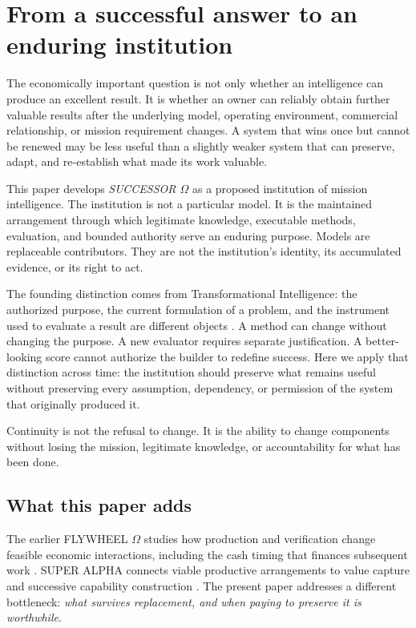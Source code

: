 \section{From a successful answer to an enduring institution}
\label{sec:institution}
The economically important question is not only whether an intelligence can produce an excellent result. It is whether an owner can reliably obtain further valuable results after the underlying model, operating environment, commercial relationship, or mission requirement changes. A system that wins once but cannot be renewed may be less useful than a slightly weaker system that can preserve, adapt, and re-establish what made its work valuable.

This paper develops \emph{SUCCESSOR $\Omega$} as a proposed institution of mission intelligence. The institution is not a particular model. It is the maintained arrangement through which legitimate knowledge, executable methods, evaluation, and bounded authority serve an enduring purpose. Models are replaceable contributors. They are not the institution's identity, its accumulated evidence, or its right to act.

The founding distinction comes from Transformational Intelligence: the authorized purpose, the current formulation of a problem, and the instrument used to evaluate a result are different objects \citep{boucherTI}. A method can change without changing the purpose. A new evaluator requires separate justification. A better-looking score cannot authorize the builder to redefine success. Here we apply that distinction across time: the institution should preserve what remains useful without preserving every assumption, dependency, or permission of the system that originally produced it.

\begin{insight}
Continuity is not the refusal to change. It is the ability to change components without losing the mission, legitimate knowledge, or accountability for what has been done.
\end{insight}

\subsection{What this paper adds}
The earlier FLYWHEEL $\Omega$ studies how production and verification change feasible economic interactions, including the cash timing that finances subsequent work \citep{boucherFlywheel}. SUPER ALPHA connects viable productive arrangements to value capture and successive capability construction \citep{boucherSuper}. The present paper addresses a different bottleneck: \emph{what survives replacement, and when paying to preserve it is worthwhile}.

